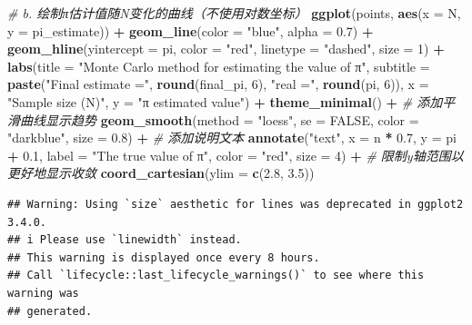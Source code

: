 \documentclass[
]{article}
\newenvironment{Shaded}{\begin{snugshade}}{\end{snugshade}}
\newcommand{\AttributeTok}[1]{\textcolor[rgb]{0.13,0.29,0.53}{#1}}
\newcommand{\CommentTok}[1]{\textcolor[rgb]{0.56,0.35,0.01}{\textit{#1}}}
\newcommand{\ConstantTok}[1]{\textcolor[rgb]{0.56,0.35,0.01}{#1}}
\newcommand{\DecValTok}[1]{\textcolor[rgb]{0.00,0.00,0.81}{#1}}
\newcommand{\FloatTok}[1]{\textcolor[rgb]{0.00,0.00,0.81}{#1}}
\newcommand{\FunctionTok}[1]{\textcolor[rgb]{0.13,0.29,0.53}{\textbf{#1}}}
\newcommand{\NormalTok}[1]{#1}
\newcommand{\SpecialCharTok}[1]{\textcolor[rgb]{0.81,0.36,0.00}{\textbf{#1}}}
\newcommand{\StringTok}[1]{\textcolor[rgb]{0.31,0.60,0.02}{#1}}
\begin{document}
\begin{Shaded}
\begin{Highlighting}[]
\CommentTok{\# b. 绘制π估计值随N变化的曲线（不使用对数坐标）}
\FunctionTok{ggplot}\NormalTok{(points, }\FunctionTok{aes}\NormalTok{(}\AttributeTok{x =}\NormalTok{ N, }\AttributeTok{y =}\NormalTok{ pi\_estimate)) }\SpecialCharTok{+}
  \FunctionTok{geom\_line}\NormalTok{(}\AttributeTok{color =} \StringTok{"blue"}\NormalTok{, }\AttributeTok{alpha =} \FloatTok{0.7}\NormalTok{) }\SpecialCharTok{+}
  \FunctionTok{geom\_hline}\NormalTok{(}\AttributeTok{yintercept =}\NormalTok{ pi, }\AttributeTok{color =} \StringTok{"red"}\NormalTok{, }\AttributeTok{linetype =} \StringTok{"dashed"}\NormalTok{, }\AttributeTok{size =} \DecValTok{1}\NormalTok{) }\SpecialCharTok{+}
  \FunctionTok{labs}\NormalTok{(}\AttributeTok{title =} \StringTok{"Monte Carlo method for estimating the value of π"}\NormalTok{,}
       \AttributeTok{subtitle =} \FunctionTok{paste}\NormalTok{(}\StringTok{"Final estimate ="}\NormalTok{, }\FunctionTok{round}\NormalTok{(final\_pi, }\DecValTok{6}\NormalTok{), }\StringTok{"real ="}\NormalTok{, }\FunctionTok{round}\NormalTok{(pi, }\DecValTok{6}\NormalTok{)),}
       \AttributeTok{x =} \StringTok{"Sample size (N)"}\NormalTok{,}
       \AttributeTok{y =} \StringTok{"π estimated value"}\NormalTok{) }\SpecialCharTok{+}
  \FunctionTok{theme\_minimal}\NormalTok{() }\SpecialCharTok{+}
  \CommentTok{\# 添加平滑曲线显示趋势}
  \FunctionTok{geom\_smooth}\NormalTok{(}\AttributeTok{method =} \StringTok{"loess"}\NormalTok{, }\AttributeTok{se =} \ConstantTok{FALSE}\NormalTok{, }\AttributeTok{color =} \StringTok{"darkblue"}\NormalTok{, }\AttributeTok{size =} \FloatTok{0.8}\NormalTok{) }\SpecialCharTok{+}
  \CommentTok{\# 添加说明文本}
  \FunctionTok{annotate}\NormalTok{(}\StringTok{"text"}\NormalTok{, }\AttributeTok{x =}\NormalTok{ n }\SpecialCharTok{*} \FloatTok{0.7}\NormalTok{, }\AttributeTok{y =}\NormalTok{ pi }\SpecialCharTok{+} \FloatTok{0.1}\NormalTok{, }
           \AttributeTok{label =} \StringTok{"The true value of π"}\NormalTok{, }\AttributeTok{color =} \StringTok{"red"}\NormalTok{, }\AttributeTok{size =} \DecValTok{4}\NormalTok{) }\SpecialCharTok{+}
  \CommentTok{\# 限制y轴范围以更好地显示收敛}
  \FunctionTok{coord\_cartesian}\NormalTok{(}\AttributeTok{ylim =} \FunctionTok{c}\NormalTok{(}\FloatTok{2.8}\NormalTok{, }\FloatTok{3.5}\NormalTok{))}
\end{Highlighting}
\end{Shaded}

\begin{verbatim}
## Warning: Using `size` aesthetic for lines was deprecated in ggplot2 3.4.0.
## i Please use `linewidth` instead.
## This warning is displayed once every 8 hours.
## Call `lifecycle::last_lifecycle_warnings()` to see where this warning was
## generated.
\end{verbatim}
\end{document}
